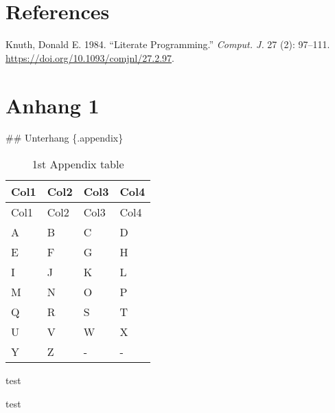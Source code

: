 \documentclass[
  11pt,
  letterpaper,
]{scrbook}
\newlength{\cslhangindent}
\newlength{\cslentryspacingunit} %
\newenvironment{CSLReferences}[2] %
 {%
  \setlength{\parindent}{0pt}
  \ifodd #1
  \let\oldpar\par
  \def\par{\hangindent=\cslhangindent\oldpar}
  \fi
  \setlength{\parskip}{#2\cslentryspacingunit}
 }%
 {}
\begin{document}

\hypertarget{references}{%
\chapter*{References}\label{references}}


\hypertarget{refs}{}
\begin{CSLReferences}{1}{0}
\leavevmode{}%
Knuth, Donald E. 1984. {``Literate Programming.''} \emph{Comput. J.} 27
(2): 97--111. \url{https://doi.org/10.1093/comjnl/27.2.97}.

\end{CSLReferences}

\cleardoublepage
{}
{}
\appendix

\hypertarget{anhang-1}{%
\chapter{Anhang 1}\label{anhang-1}}

\setcounter{page}{1}
\renewcommand{\thepage}{\thechapter.\arabic{page}} %

\#\# Unterhang \{.appendix\}

\hypertarget{tbl-letters-full}{}
\begin{longtable}[]{@{}llll@{}}
\caption{\label{tbl-letters-full}1st Appendix table}\tabularnewline
\toprule\noalign{}
Col1 & Col2 & Col3 & Col4 \\
\midrule\noalign{}
\endfirsthead
\toprule\noalign{}
Col1 & Col2 & Col3 & Col4 \\
\midrule\noalign{}
\endhead
\bottomrule\noalign{}
\endlastfoot
A & B & C & D \\
E & F & G & H \\
I & J & K & L \\
M & N & O & P \\
Q & R & S & T \\
U & V & W & X \\
Y & Z & - & - \\
\end{longtable}

\newpage{}

test

\newpage{}

test
\end{document}
